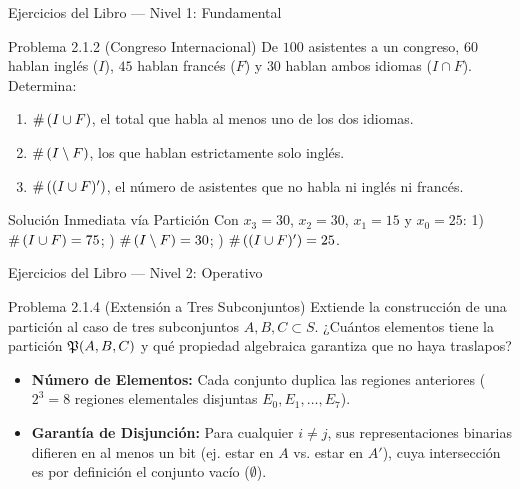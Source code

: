 \begin{frame}{Ejercicios del Libro — Nivel 1: Fundamental}
  \begin{block}{Problema 2.1.2 (Congreso Internacional)}
    De $100$ asistentes a un congreso, $60$ hablan inglés ($I$), $45$ hablan francés ($F$) y $30$ hablan ambos idiomas ($I \cap F$). Determina:
    \begin{enumerate}
      \item $\#\left( I \cup F \right)$, el total que habla al menos uno de los dos idiomas. \pause
      \item $\#\left( I \setminus F \right)$, los que hablan estrictamente solo inglés. \pause
      \item $\#\left( (I \cup F)' \right)$, el número de asistentes que no habla ni inglés ni francés.
    \end{enumerate}
  \end{block}
  
  \vspace{0.3em}
  \pause
  \begin{alertblock}{Solución Inmediata vía Partición}
    Con $x_3=30$, $x_2=30$, $x_1=15$ y $x_0=25$:
    1) $\#\left( I \cup F \right) = 75$; ) $\#\left( I \setminus F \right) = 30$; ) $\#\left( (I \cup F)' \right) = 25$.
  \end{alertblock}
\end{frame}

\begin{frame}{Ejercicios del Libro — Nivel 2: Operativo}
  \begin{block}{Problema 2.1.4 (Extensión a Tres Subconjuntos)}
    Extiende la construcción de una partición al caso de tres subconjuntos $A, B, C \subset S$. ¿Cuántos elementos tiene la partición $\mathfrak{P}(A,B,C)$ y qué propiedad algebraica garantiza que no haya traslapos?
  \end{block}
  
  \vspace{0.4em}
  \pause
  \begin{itemize}
    \item \textbf{Número de Elementos:} Cada conjunto duplica las regiones anteriores ($2^3 = 8$ regiones elementales disjuntas $E_0, E_1, \dots, E_7$). \pause
    \item \textbf{Garantía de Disjunción:} Para cualquier $i \neq j$, sus representaciones binarias difieren en al menos un bit (ej. estar en $A$ vs. estar en $A'$), cuya intersección es por definición el conjunto vacío ($\emptyset$).
  \end{itemize}
\end{frame}

